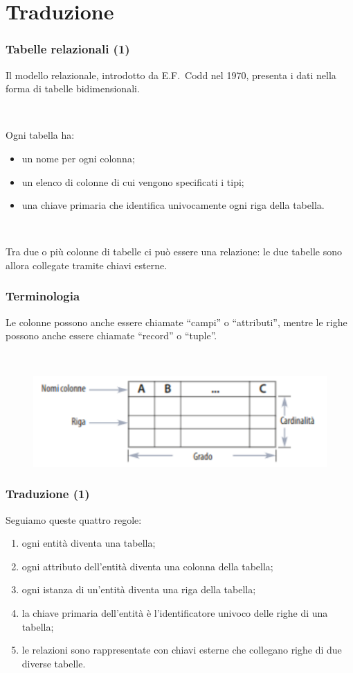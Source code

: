 \documentclass[]{beamer}
\begin{document}
\section{Traduzione}


\begin{frame}
\frametitle{Tabelle relazionali (1)}
Il modello relazionale, introdotto da E.F.~Codd nel 1970, presenta i dati nella forma di \alert<1>{tabelle bidimensionali}.\pause

~

Ogni tabella ha:
\begin{itemize}
  \item un nome per ogni colonna;\pause
  \item un elenco di colonne di cui vengono specificati i tipi;\pause
  \item una \alert<4>{chiave primaria} che identifica univocamente ogni riga della tabella.\pause
\end{itemize}

~

Tra due o più colonne di tabelle ci può essere una relazione: le due tabelle sono allora collegate tramite \alert<5>{chiavi esterne}.
\end{frame}


\begin{frame}
\frametitle{Terminologia}
Le colonne possono anche essere chiamate ``campi'' o ``attributi'', mentre le righe possono anche essere chiamate ``record'' o ``tuple''.

~

\begin{figure}
  \includegraphics[width=.75\columnwidth]{img/tabellaterminologia.png}
\end{figure}
\end{frame}


\begin{frame}
\frametitle{Traduzione (1)}
Seguiamo queste quattro regole:
\begin{enumerate}
  \item ogni entità diventa una tabella;\pause
  \item ogni attributo dell'entità diventa una colonna della tabella;\pause
  \item ogni istanza di un'entità diventa una riga della tabella;\pause
  \item la chiave primaria dell'entità è l'identificatore univoco delle righe di una tabella;\pause
  \item le relazioni sono rappresentate con chiavi esterne che collegano righe di due diverse tabelle.\pause
\end{enumerate}
\end{frame}
\end{document}
